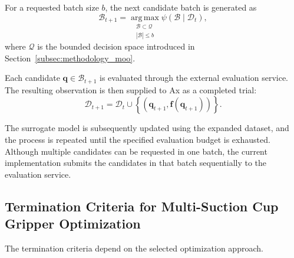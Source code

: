 For a requested batch size $b$, the next candidate batch is generated as
\begin{equation}
    \mathcal{B}_{t+1}
    =
    \operatorname*{arg\,max}_{
        \substack{
            \mathcal{B}\subset\mathcal{Q}\\
            |\mathcal{B}|\leq b
        }
    }
    \psi(\mathcal{B}\mid\mathcal{D}_t),
\end{equation}
where $\mathcal{Q}$ is the bounded decision space introduced in
Section~\ref{subsec:methodology_moo}.

Each candidate $\mathbf{q}\in\mathcal{B}_{t+1}$ is evaluated through the external evaluation
service. The resulting observation is then supplied to Ax as a completed trial:
\begin{equation}
    \mathcal{D}_{t+1}
    =
    \mathcal{D}_t
    \cup
    \left\{
        \left(
            \mathbf{q}_{t+1},
            \mathbf{f}(\mathbf{q}_{t+1})
        \right)
    \right\}.
\end{equation}

The surrogate model is subsequently updated using the expanded dataset, and the process is repeated
until the specified evaluation budget is exhausted. Although multiple candidates can be requested in
one batch, the current implementation submits the candidates in that batch sequentially to the
evaluation service.

\subsection{Termination Criteria for Multi-Suction Cup Gripper Optimization}

The termination criteria depend on the selected optimization approach.


